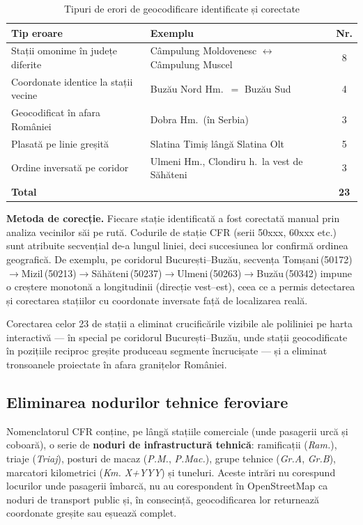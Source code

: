 \documentclass[12pt,a4paper]{report}
\begin{document}
\begin{table}[ht]\small\linespread{1}
\caption{Tipuri de erori de geocodificare identificate și corectate}
\label{tab:geocoding-errors}
\begin{tabular}{p{4.3cm} p{4.7cm} c}
\textbf{Tip eroare} & \textbf{Exemplu} & \textbf{Nr.} \\\hline
Stații omonime în județe diferite & Câmpulung Moldovenesc $\leftrightarrow$ Câmpulung Muscel & 8 \\
Coordonate identice la stații vecine & Buzău Nord Hm.\ $=$ Buzău Sud & 4 \\
Geocodificat în afara României & Dobra Hm.\ (în Serbia) & 3 \\
Plasată pe linie greșită & Slatina Timiș lângă Slatina Olt & 5 \\
Ordine inversată pe coridor & Ulmeni Hm., Clondiru h.\ la vest de Săhăteni & 3 \\
\hline
\textbf{Total} & & \textbf{23} \\
\hline
\end{tabular}
\end{table}

\textbf{Metoda de corecție.} Fiecare stație identificată a fost corectată manual prin analiza vecinilor săi pe rută. Codurile de stație CFR (serii 50xxx, 60xxx etc.) sunt atribuite secvențial de-a lungul liniei, deci succesiunea lor confirmă ordinea geografică. De exemplu, pe coridorul București--Buzău, secvența Tomșani\,(50172)$\to$Mizil\,(50213)$\to$Săhăteni\,(50237)$\to$Ulmeni\,(50263)$\to$Buzău\,(50342) impune o creștere monotonă a longitudinii (direcție vest--est), ceea ce a permis detectarea și corectarea stațiilor cu coordonate inversate față de localizarea reală.

Corectarea celor 23 de stații a eliminat crucificările vizibile ale poliliniei pe harta interactivă --- în special pe coridorul București--Buzău, unde stații geocodificate în pozițiile reciproc greșite produceau segmente încrucișate --- și a eliminat tronsoanele proiectate în afara granițelor României.

\subsection{Eliminarea nodurilor tehnice feroviare}

Nomenclatorul CFR conține, pe lângă stațiile comerciale (unde pasagerii urcă și coboară), o serie de \textbf{noduri de infrastructură tehnică}: ramificații (\emph{Ram.}), triaje (\emph{Triaj}), posturi de macaz (\emph{P.M.}, \emph{P.Mac.}), grupe tehnice (\emph{Gr.A}, \emph{Gr.B}), marcatori kilometrici (\emph{Km. X+YYY}) și tuneluri. Aceste intrări nu corespund locurilor unde pasagerii îmbarcă, nu au corespondent în OpenStreetMap ca noduri de transport public și, în consecință, geocodificarea lor returnează coordonate greșite sau eșuează complet.
\end{document}
